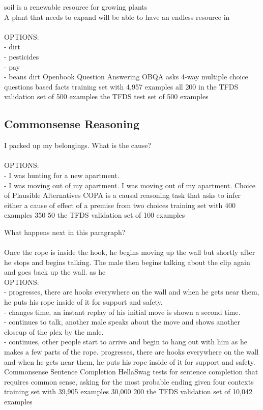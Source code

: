\taskio
{soil is a renewable resource for growing plants\\A plant that needs to expand will be able to have an endless resource in\\\\OPTIONS:\\- dirt\\- pesticides\\- pay\\- beans}
{dirt}
{
    \taskdescription
    {Openbook Question Answering} %
    {OBQA} %
    {\citep{mihaylov-etal-2018-suit}} %
    {asks 4-way multiple choice questions based facts} %
    {training set with 4,957 examples} %
    {all} %
    {200 in the TFDS validation set of 500 examples} %
    {the TFDS test set of 500 examples} %
}




\clearpage 
\subsection{Commonsense Reasoning}\label{appen:b-commonsense}

\taskio
{I packed up my belongings. What is the cause?\\\\OPTIONS:\\- I was hunting for a new apartment.\\- I was moving out of my apartment.}
{I was moving out of my apartment.}
{
    \taskdescription
    {Choice of Plausible Alternatives} %
    {COPA} %
    {\citep{SSS112418}} %
    {is a causal reasoning task that asks to infer either a cause of effect of a premise from two choices} %
    {training set with 400 examples} %
    {350} %
    {50} %
    {the TFDS validation set of 100 examples} %
}

\taskio
{What happens next in this paragraph?\\\\Once the rope is inside the hook, he begins moving up the wall but shortly after he stops and begins talking. The male then begins talking about the clip again and goes back up the wall. as he\\OPTIONS:\\- progresses, there are hooks everywhere on the wall and when he gets near them, he puts his rope inside of it for support and safety.\\- changes time, an instant replay of his initial move is shown a second time.\\- continues to talk, another male speaks about the move and shows another closeup of the plex by the male.\\- continues, other people start to arrive and begin to hang out with him as he makes a few parts of the rope.}
{progresses, there are hooks everywhere on the wall and when he gets near them, he puts his rope inside of it for support and safety.}
{
\taskdescription
    {Commonsense Sentence Completion} %
    {HellaSwag} %
    {\citep{zellers-etal-2019-hellaswag}} %
    {tests for sentence completion that requires common sense, asking for the most probable ending given four contexts} %
    {training set with 39,905 examples} %
    {30,000} %
    {200} %
    {the TFDS validation set of 10,042 examples} %
}

